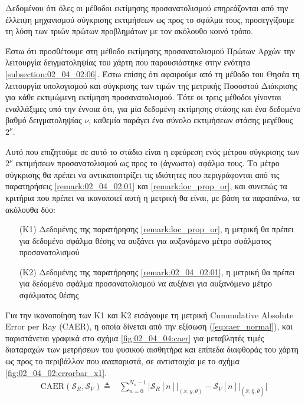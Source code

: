 Δεδομένου ότι όλες οι μέθοδοι εκτίμησης προσανατολισμού επηρεάζονται από την
έλλειψη μηχανισμού σύγκρισης εκτιμήσεων ως προς το σφάλμα τους, προσεγγίζουμε
τη λύση των τριών πρώτων προβλημάτων με τον ακόλουθο κοινό τρόπο.

Έστω ότι προσθέτουμε στη μέθοδο εκτίμησης προσανατολισμού Πρώτων Αρχών την
λειτουργία δειγματοληψίας του χάρτη που παρουσιάστηκε στην ενότητα
\ref{subsection:02_04_02:06}. Έστω επίσης ότι αφαιρούμε από τη μέθοδο του Θησέα
τη λειτουργία υπολογισμού και σύγκρισης των τιμών της μετρικής Ποσοστού
Διάκρισης για κάθε εκτιμώμενη εκτίμηση προσανατολισμού. Τότε οι τρεις μέθοδοι
γίνονται εναλλάξιμες υπό την έννοια ότι, για μία δεδομένη εκτίμησης στάσης και
ένα δεδομένο βαθμό δειγματοληψίας $\nu$, καθεμία παράγει ένα σύνολο εκτιμήσεων
στάσης μεγέθους $2^\nu$.

Αυτό που επιζητούμε σε αυτό το στάδιο είναι η εφεύρεση ενός μέτρου σύγκρισης
των $2^\nu$ εκτιμήσεων προσανατολισμού ως προς το (άγνωστο) σφάλμα τους. Το
μέτρο σύγκρισης θα πρέπει να αντικατοπτρίζει τις ιδιότητες που περιγράφονται
από τις παρατηρήσεις \ref{remark:02_04_02:01} και \ref{remark:loc_prop_or},
και συνεπώς τα κριτήρια που πρέπει να ικανοποιεί αυτή η μετρική θα είναι, με
βάση τα παραπάνω, τα ακόλουθα δύο:

\begin{itemize}
  \item[(K1)] Δεδομένης της παρατήρησης \ref{remark:loc_prop_or}, η μετρική θα
        πρέπει για δεδομένο σφάλμα θέσης να αυξάνει για αυξανόμενο μέτρο
        σφάλματος προσανατολισμού
  \item[(K2)] Δεδομένης της παρατήρησης \ref{remark:02_04_02:01}, η μετρική θα
        πρέπει για δεδομένο σφάλμα προσανατολισμού να αυξάνει για αυξανόμενο
        μέτρο σφάλματος θέσης
\end{itemize}

Για την ικανοποίηση των Κ1 και Κ2 εισάγουμε τη μετρική Cummulative Absolute
Error per Ray (CAER), η οποία δίνεται από την εξίσωση (\ref{eq:caer_normal}),
και παριστάνεται γραφικά στο σχήμα \ref{fig:02_04_04:caer} για μεταβλητές τιμές
διαταραχών των μετρήσεων του φυσικού αισθητήρα και επίπεδα διαφθοράς του χάρτη
ως προς το περιβάλλον που αναπαριστά, σε αντιστοιχία με το σχήμα
\ref{fig:02_04_02:errorbar_x1}.
\begin{align}
  \text{CAER}(\mathcal{S}_R, \mathcal{S}_V) \triangleq & \sum\limits_{n=0}^{N_s-1} \Bigg|
    \mathcal{S}_R[n]\Big|_{(x, y, \theta)} -
    \mathcal{S}_V[n]\Big|_{(\hat{x}, \hat{y}, \hat{\theta})} \Bigg|
  \label{eq:caer_normal}
\end{align}

